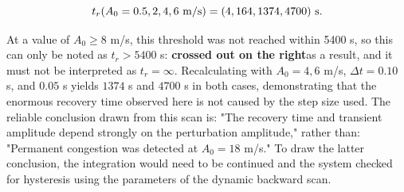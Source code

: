 \documentclass[11pt,a4paper,openany]{book}
\numberwithin{equation}{chapter}
\numberwithin{figure}{chapter}
\numberwithin{table}{chapter}
\begin{document}
\begin{equation}
t_r(A_0=0.5,2,4,6\ {\rm m/s})=(4,164,1374,4700)\ {\rm s}.
\label{eq:nonlinear-recovery-times}
\end{equation}

At a value of $A_0\ge8$ m/s, this threshold was not reached within 5400 s, so this can only be noted as $t_r>5400$ s:
\textbf{crossed out on the right}as a result, and it must not be interpreted as $t_r=\infty$. Recalculating with $A_0=4,6$ m/s, $\Delta t=0.10$ s, and $0.05$ s yields $1374$ s and $4700$ s in both cases, demonstrating that the enormous recovery time observed here is not caused by the step size used. The reliable conclusion drawn from this scan is: "The recovery time and transient amplitude depend strongly on the perturbation amplitude," rather than: "Permanent congestion was detected at $A_0=18$ m/s." To draw the latter conclusion, the integration would need to be continued and the system checked for hysteresis using the parameters of the dynamic backward scan.
\end{document}
